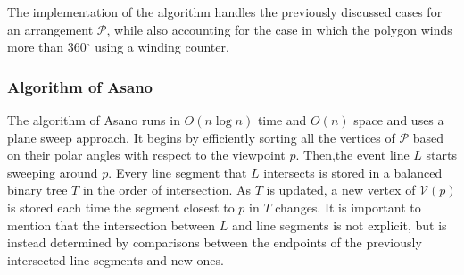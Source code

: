 The implementation of the algorithm handles the previously discussed cases for an arrangement $\mathcal P$, while also accounting for the case in which the polygon winds more than 360$^\circ$ using a winding counter.

\subsubsection{Algorithm of Asano \cite{asano1985efficient}}
The algorithm of Asano \cite{asano1985efficient} runs in $O(n \log n)$ time and $O(n)$ space and uses a plane sweep approach. It begins by efficiently sorting all the vertices of $\mathcal P$ based on their polar angles with respect to the viewpoint $p$. Then,the event line $L$ starts sweeping around $p$. Every line segment that $L$ intersects is stored in a balanced binary tree $T$ in the order of intersection. As $T$ is updated, a new vertex of $\mathcal V(p)$ is stored each time the segment closest to $p$ in $T$ changes. It is important to mention that the intersection between $L$ and line segments is not explicit, but is instead determined by comparisons between the endpoints of the previously intersected line segments and new ones. 

